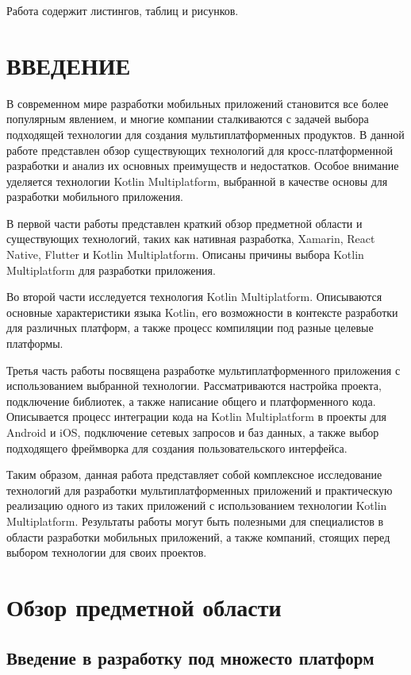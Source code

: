 \documentclass[14pt, russian]{scrartcl}
\newcommand{\anonsection}[1]{\cleardoublepage
\phantomsection
\addcontentsline{toc}{section}{\protect\numberline{}#1}
\section*{#1}\vspace*{2.5ex} %
}
\begin{document}
Работа содержит \totallistings{} листингов, \totaltables{} таблиц и \totalfigures{} рисунков.

\newpage
\renewcommand\contentsname{\hfill{\normalfont{СОДЕРЖАНИЕ}}\hfill}  %
\tableofcontents
\newpage
\anonsection{ВВЕДЕНИЕ}  %

В современном мире разработки мобильных приложений становится все более популярным явлением, и многие компании сталкиваются с задачей выбора подходящей технологии для создания мультиплатформенных продуктов. В данной работе представлен обзор существующих технологий для кросс-платформенной разработки и анализ их основных преимуществ и недостатков. Особое внимание уделяется технологии Kotlin Multiplatform, выбранной в качестве основы для разработки мобильного приложения.

В первой части работы представлен краткий обзор предметной области и существующих технологий, таких как нативная разработка, Xamarin, React Native, Flutter и Kotlin Multiplatform. Описаны причины выбора Kotlin Multiplatform для разработки приложения.

Во второй части исследуется технология Kotlin Multiplatform. Описываются основные характеристики языка Kotlin, его возможности в контексте разработки для различных платформ, а также процесс компиляции под разные целевые платформы.

Третья часть работы посвящена разработке мультиплатформенного приложения с использованием выбранной технологии. Рассматриваются настройка проекта, подключение библиотек, а также написание общего и платформенного кода. Описывается процесс интеграции кода на Kotlin Multiplatform в проекты для Android и iOS, подключение сетевых запросов и баз данных, а также выбор подходящего фреймворка для создания пользовательского интерфейса.

Таким образом, данная работа представляет собой комплексное исследование технологий для разработки мультиплатформенных приложений и практическую реализацию одного из таких приложений с использованием технологии Kotlin Multiplatform. Результаты работы могут быть полезными для специалистов в области разработки мобильных приложений, а также компаний, стоящих перед выбором технологии для своих проектов.

\section{Обзор предметной области}

\subsection{Введение в разработку под множесто платформ}
\end{document}
